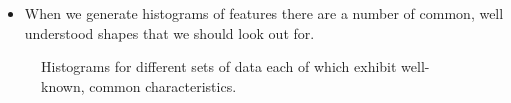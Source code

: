 \documentclass[xcolor={table}]{beamer}
\begin{document}
\begin{frame}
	\begin{itemize}
		\item When we generate histograms of features there are a number of common, well understood shapes that we should look out for. 
		\end{itemize}
\end{frame}

 \begin{frame} 
\begin{figure}[htb]
\centering
{} 
\caption{Histograms for different sets of data each of which exhibit well-known, common characteristics.}
\label{fig:histogram_shapes}
\end{figure}
\end{frame} 
\end{document}
